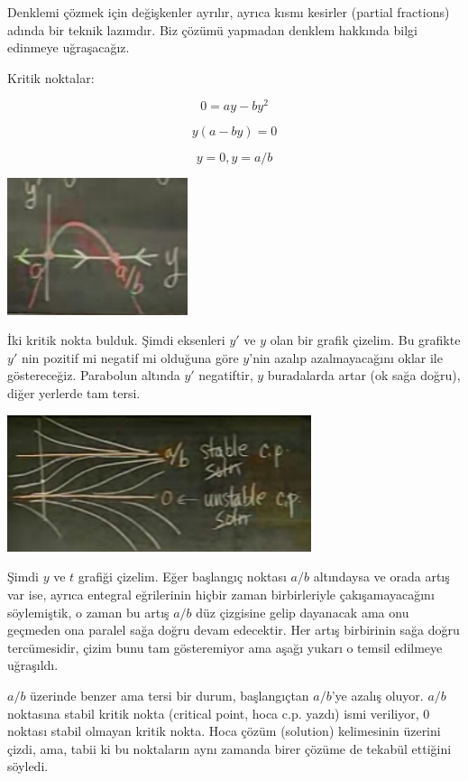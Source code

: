 \documentclass[12pt,fleqn]{article}\usepackage{../../common}
\begin{document}
Denklemi çözmek için değişkenler ayrılır, ayrıca kısmı kesirler (partial
fractions) adında bir teknik lazımdır. Biz çözümü yapmadan denklem hakkında
bilgi edinmeye uğraşacağız. 

Kritik noktalar: 

$$ 0 = ay - by^2 $$

$$ y(a-by) = 0$$

$$ y = 0, y=a/b $$

\includegraphics[height=4cm]{5_7.png}

İki kritik nokta bulduk. Şimdi eksenleri $y'$ ve $y$ olan bir grafik
çizelim. Bu grafikte $y'$ nin pozitif mi negatif mi olduğuna göre $y$'nin
azalıp azalmayacağını oklar ile göstereceğiz. Parabolun altında $y'$
negatiftir, $y$ buradalarda artar (ok sağa doğru), diğer yerlerde tam
tersi. 

\includegraphics[height=4cm]{5_8.png}

Şimdi $y$ ve $t$ grafiği çizelim. Eğer başlangıç noktası $a/b$ altındaysa
ve orada artış var ise, ayrıca entegral eğrilerinin hiçbir zaman
birbirleriyle çakışamayacağını söylemiştik, o zaman bu artış $a/b$ düz
çizgisine gelip dayanacak ama onu geçmeden ona paralel sağa doğru devam
edecektir. Her artış birbirinin sağa doğru tercümesidir, çizim bunu tam
gösteremiyor ama aşağı yukarı o temsil edilmeye uğraşıldı.

$a/b$ üzerinde benzer ama tersi bir durum, başlangıçtan $a/b$'ye azalış
oluyor. $a/b$ noktasına stabil kritik nokta (critical point, hoca
c.p. yazdı) ismi veriliyor, $0$ noktası stabil olmayan kritik nokta. Hoca
çözüm (solution) kelimesinin üzerini çizdi, ama, tabii ki bu noktaların
aynı zamanda birer çözüme de tekabül ettiğini söyledi.
\end{document}
